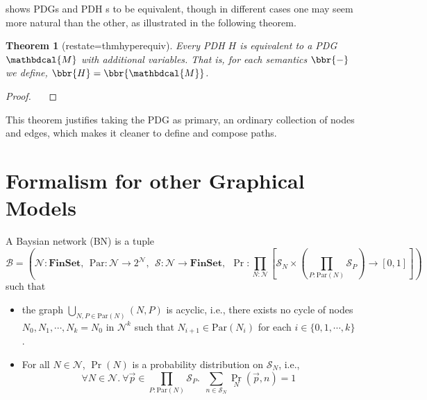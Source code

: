 \documentclass{article}
\theoremstyle{plain}
\newtheorem{theorem}{Theorem}[section]
\theoremstyle{definition}
\theoremstyle{remark}
\newcommand{\todo}[1]{{\color{red}\ \!\Large\smash{\textbf{[}}{\normalsize\textsc{todo:} #1}\ \!\smash{\textbf{]}}}}
\newcommand{\dg}[1]{\mathbdcal{#1}}
\numberwithin{equation}{section}
\begin{document}
{ shows PDGs and PDH s to be equivalent, though in different cases one may seem more natural than the other, as illustrated in the following theorem.

\begin{theorem}[restate=thmhyperequiv]\label{thm:hyperequiv}
	Every PDH $H$ is equivalent to a PDG $\dg M$ with additional variables. That is, for each semantics $\bbr{-}$ we define, $\bbr{H} = \bbr{\dg M}$.
\end{theorem}
\begin{proof}
	\todo{}
\end{proof}

This theorem justifies taking the PDG as primary, an ordinary collection of nodes and edges, which makes it cleaner to define and compose paths. 


\section{Formalism for other Graphical Models}
\begin{defn}
	A Baysian network (BN) is a tuple
	\[
	\mathcal B = \left(\mathcal N : \mathbf{FinSet}, ~~\mathrm{Par}: \mathcal N \to 2^{\mathcal N},~~ \mathcal S: \mathcal N \to \mathbf{FinSet},~~\Pr: \prod_{N : \mathcal N}  \left[ \mathcal S_N \times \left(\prod_{P : \mathrm{Par}(N)} \mathcal S_P\right)  \to [0,1] \right] \right)
	\]
	such that
	\begin{itemize}[nosep]
		\item the graph $\bigcup_{N, P \in \mathrm{Par}(N)}(N, P)$ is acyclic, i.e., there exists no cycle of nodes $N_0, N_1, \cdots, N_k = N_0$ in $\mathcal N^k$ such that $N_{i+1} \in \mathrm{Par}(N_i)$ for each $i \in \{0, 1, \cdots, k\}$.
		\item For all $N \in \mathcal N$, $\Pr(N)$ is a probability distribution on $\mathcal S_N$, i.e., 
		\[ \forall N\in \mathcal N.~\forall \vec{p} \in {\prod_{P : \mathrm{Par}(N)} \mathcal S_P}.~~ \sum_{n \in \mathcal S_{N}} \Pr_N(\vec{p}, n) = 1\]
	\end{itemize}
\end{defn}


}
\end{document}
